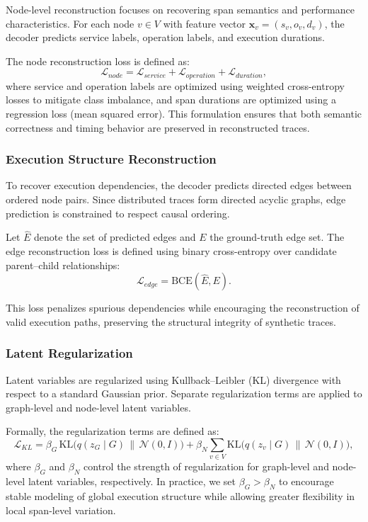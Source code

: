 \documentclass[sigconf,review]{acmart}
\begin{document}
Node-level reconstruction focuses on recovering span semantics and performance characteristics. For each node $v \in V$ with feature vector $\mathbf{x}_v = (s_v, o_v, d_v)$, the decoder predicts service labels, operation labels, and execution durations.

The node reconstruction loss is defined as:
\begin{equation}
\mathcal{L}_{node} =
\mathcal{L}_{service} +
\mathcal{L}_{operation} +
\mathcal{L}_{duration},
\end{equation}
where service and operation labels are optimized using weighted cross-entropy losses to mitigate class imbalance, and span durations are optimized using a regression loss (mean squared error). This formulation ensures that both semantic correctness and timing behavior are preserved in reconstructed traces.

\subsubsection{Execution Structure Reconstruction}

To recover execution dependencies, the decoder predicts directed edges between ordered node pairs. Since distributed traces form directed acyclic graphs, edge prediction is constrained to respect causal ordering.

Let $\hat{E}$ denote the set of predicted edges and $E$ the ground-truth edge set. The edge reconstruction loss is defined using binary cross-entropy over candidate parent--child relationships:
\begin{equation}
\mathcal{L}_{edge} =
\mathrm{BCE}(\hat{E}, E).
\end{equation}

This loss penalizes spurious dependencies while encouraging the reconstruction of valid execution paths, preserving the structural integrity of synthetic traces.

\subsubsection{Latent Regularization}

Latent variables are regularized using Kullback--Leibler (KL) divergence with respect to a standard Gaussian prior. Separate regularization terms are applied to graph-level and node-level latent variables.

Formally, the regularization terms are defined as:
\begin{equation}
\mathcal{L}_{KL} =
\beta_G \, \mathrm{KL}\big(q(z_G \mid G) \,\|\, \mathcal{N}(0, I)\big)
+
\beta_N \sum_{v \in V}
\mathrm{KL}\big(q(z_v \mid G) \,\|\, \mathcal{N}(0, I)\big),
\end{equation}
where $\beta_G$ and $\beta_N$ control the strength of regularization for graph-level and node-level latent variables, respectively. In practice, we set $\beta_G > \beta_N$ to encourage stable modeling of global execution structure while allowing greater flexibility in local span-level variation.
\end{document}
